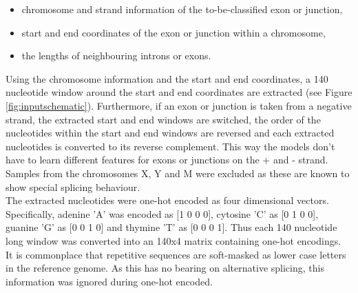 \begin{itemize}
	\item chromosome and strand information of the to-be-classified exon or junction,
	\item start and end coordinates of the exon or junction within a chromosome,
	\item the lengths of neighbouring introns or exons.
\end{itemize}

Using the chromosome information and the start and end coordinates, a 140 nucleotide window around the start and end coordinates are extracted (see Figure \ref{fig:inputschematic}). Furthermore, if an exon or junction is taken from a negative strand, the extracted start and end windows are switched, the order of the nucleotides within the start and end windows are reversed and each extracted nucleotides is converted to its reverse complement. This way the models don't have to learn different features for exons or junctions on the + and - strand.
Samples from the chromosomes X, Y and M were excluded as these are known to show special splicing behaviour. \\
The extracted nucleotides were one-hot encoded as four dimensional vectors. Specifically, adenine 'A' was encoded as [1 0 0 0], cytosine 'C' as [0 1 0 0], guanine 'G' as [0 0 1 0] and thymine 'T' as [0 0 0 1]. Thus each 140 nucleotide long window was converted into an 140x4 matrix containing one-hot encodings.\\

It is commonplace that repetitive sequences are soft-masked as lower case letters in the reference genome. As this has no bearing on alternative splicing, this information was ignored during one-hot encoded.\\


